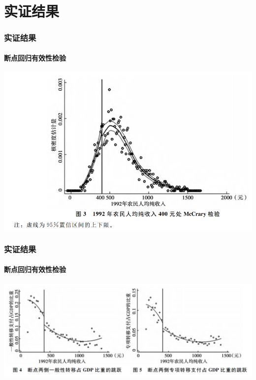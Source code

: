 \section{实证结果} 


\begin{frame}[t]
\frametitle{实证结果}
\framesubtitle{断点回归有效性检验}
\begin{center}
	\includegraphics[width=\textwidth]{image/t3.png}
\end{center}

\end{frame}

\begin{frame}[t]
	\frametitle{实证结果}
	\framesubtitle{断点回归有效性检验}
	\begin{center}
		\includegraphics[width=\textwidth]{image/t4-5.png}
	\end{center}
	
\end{frame}

